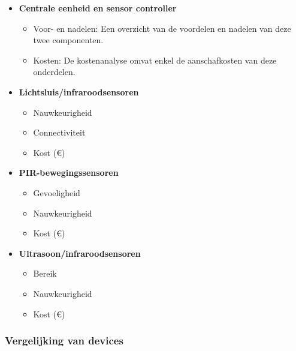 \begin{itemize}
    \item \textbf{Centrale eenheid en sensor controller}
    \begin{itemize}
        \item Voor- en nadelen: Een overzicht van de voordelen en nadelen van deze twee componenten.
        \item Kosten: De kostenanalyse omvat enkel de aanschafkosten van deze onderdelen.  
    \end{itemize}
    
    \item \textbf{Lichtsluis/infraroodsensoren}
    \begin{itemize}
        \item Nauwkeurigheid
        \item Connectiviteit
        \item Kost (€)
    \end{itemize}

    \item \textbf{PIR-bewegingssensoren}
    \begin{itemize}
        \item Gevoeligheid
        \item Nauwkeurigheid
        \item Kost (€)
    \end{itemize}
    
    \item \textbf{Ultrasoon/infraroodsensoren}
    \begin{itemize}
        \item Bereik
        \item Nauwkeurigheid
        \item Kost (€)
    \end{itemize}

        
\end{itemize}

\subsubsection{Vergelijking van devices}

